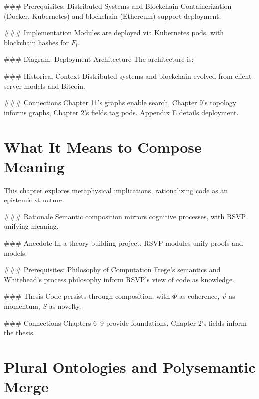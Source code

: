 \documentclass[12pt]{article}
\begin{document}
{### Prerequisites: Distributed Systems and Blockchain
Containerization (Docker, Kubernetes) and blockchain (Ethereum) support deployment.

### Implementation
Modules are deployed via Kubernetes pods, with blockchain hashes for $F_i$.

### Diagram: Deployment Architecture
The architecture is:

\begin{center}
\end{center}

### Historical Context
Distributed systems and blockchain evolved from client-server models and Bitcoin.

### Connections
Chapter 11’s graphs enable search, Chapter 9’s topology informs graphs, Chapter 2’s fields tag pods. Appendix E details deployment.

\section{What It Means to Compose Meaning}
\label{sec:chapter13}

This chapter explores metaphysical implications, rationalizing code as an epistemic structure.

### Rationale
Semantic composition mirrors cognitive processes, with RSVP unifying meaning.

### Anecdote
In a theory-building project, RSVP modules unify proofs and models.

### Prerequisites: Philosophy of Computation
Frege’s semantics and Whitehead’s process philosophy inform RSVP’s view of code as knowledge.

### Thesis
Code persists through composition, with $\Phi$ as coherence, $\vec{v}$ as momentum, $S$ as novelty.

### Connections
Chapters 6–9 provide foundations, Chapter 2’s fields inform the thesis.

\section{Plural Ontologies and Polysemantic Merge}
\label{sec:chapter14}

}
\end{document}

